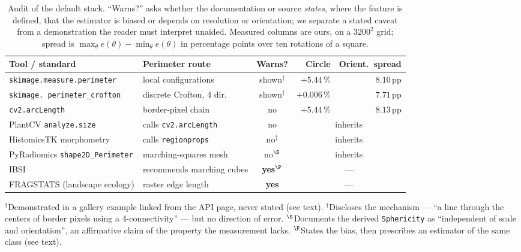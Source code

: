 \documentclass{article}
\begin{document}
\begin{table}[htbp]
\centering
\caption{Audit of the default stack. ``Warns?'' asks whether the documentation or source
\emph{states}, where the feature is defined, that the estimator is biased or depends on
resolution or orientation; we separate a stated caveat from a demonstration the reader must
interpret unaided. Measured columns are ours, on a $3200^2$ grid; spread is
$\max_\theta e(\theta) - \min_\theta e(\theta)$ in percentage points over ten rotations of a
square.}
\label{tab:audit}
\small
\begin{tabular}{llcrr}
\toprule
Tool / standard & Perimeter route & Warns? & Circle & Orient.\ spread \\
\midrule
\texttt{skimage.measure.perimeter}      & local configurations         & shown$^\dagger$   & $+5.44\,\%$  & $8.10$\,pp \\
\texttt{skimage.\,perimeter\_crofton}   & discrete Crofton, 4 dir.     & shown$^\dagger$   & $+0.006\,\%$ & $7.71$\,pp \\
\texttt{cv2.arcLength}                  & border-pixel chain           & no                & $+5.44\,\%$  & $8.13$\,pp \\
PlantCV \texttt{analyze.size}           & calls \texttt{cv2.arcLength} & no                & \multicolumn{2}{c}{inherits} \\
HistomicsTK morphometry                 & calls \texttt{regionprops}   & no$^\ddagger$     & \multicolumn{2}{c}{inherits} \\
PyRadiomics \texttt{shape2D\_Perimeter} & marching-squares mesh        & no$^{\S}$         & \multicolumn{2}{c}{inherits} \\
IBSI                                    & recommends marching cubes    & \textbf{yes}$^{\P}$ & \multicolumn{2}{c}{---} \\
\midrule
FRAGSTATS (landscape ecology)           & raster edge length           & \textbf{yes}      & \multicolumn{2}{c}{---} \\
\bottomrule
\end{tabular}
\vspace{3pt}
\parbox{0.97\textwidth}{\footnotesize $^\dagger$Demonstrated in a gallery example linked from the
API page, never stated (see text). $^\ddagger$Discloses the mechanism --- ``a line through the
centers of border pixels using a 4-connectivity'' --- but no direction of error.
$^{\S}$Documents the derived \texttt{Sphericity} as ``independent of scale and orientation'', an
affirmative claim of the property the measurement lacks. $^{\P}$States the bias, then prescribes
an estimator of the same class (see text).}
\end{table}
\end{document}
